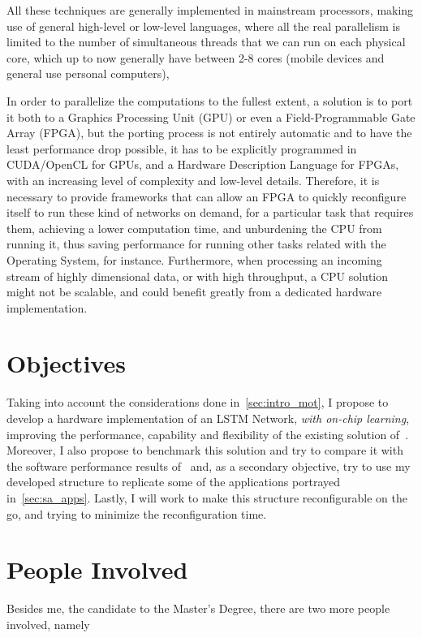 All these techniques are generally implemented in mainstream processors, making use of general high-level or low-level languages, where all the real parallelism is limited to the number of simultaneous threads that we can run on each physical core, which up to now generally have between 2-8 cores (mobile devices and general use personal computers), 

In order to parallelize the computations to the fullest extent, a solution is to port it both to a Graphics Processing Unit (GPU) or even a Field-Programmable Gate Array (FPGA), but the porting process is not entirely automatic and to have the least performance drop possible, it has to be explicitly programmed in CUDA/OpenCL for GPUs, and a Hardware Description Language for FPGAs, with an increasing level of complexity and low-level details. Therefore, it is necessary to provide frameworks that can allow an FPGA to quickly reconfigure itself to run these kind of networks on demand, for a particular task that requires them, achieving a lower computation time, and unburdening the CPU from running it, thus saving performance for running other tasks related with the Operating System, for instance. Furthermore, when processing an incoming stream of highly dimensional data, or with high throughput, a CPU solution might not be scalable, and could benefit greatly from a dedicated hardware implementation.

\section{Objectives}\label{sec:intro_obj}
Taking into account the considerations done in~\ref{sec:intro_mot}, I propose to develop a hardware implementation of an LSTM Network, \emph{with on-chip learning}, improving the performance, capability and flexibility of the existing solution of~\cite{Chang15}. Moreover, I also propose to benchmark this solution and try to compare it with the software performance results of~\cite{Tavear13} and, as a secondary objective, try to use my developed structure to replicate some of the applications portrayed in~\ref{sec:sa_apps}. Lastly, I will work to make this structure reconfigurable on the go, and trying to minimize the reconfiguration time.

\section{People Involved}\label{sec:intro_people}
Besides me, the candidate to the Master's Degree, there are two more people involved, namely

